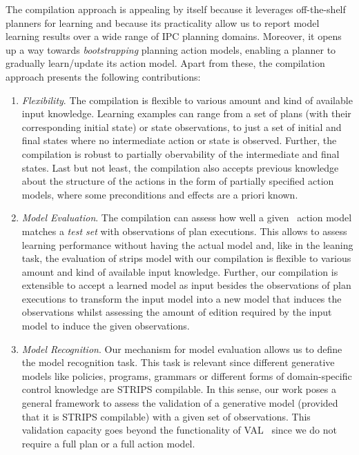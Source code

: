 The compilation approach is appealing by itself because it leverages off-the-shelf planners for learning and because its practicality allow us to report model learning results over a wide range of IPC planning domains. Moreover, it opens up a way towards \emph{bootstrapping} planning action models, enabling a planner to gradually learn/update its action model. Apart from these, the compilation approach presents the following contributions:
\begin{enumerate}
\item {\em Flexibility}. The compilation is flexible to various amount and kind of available input knowledge. Learning examples can range from a set of plans (with their corresponding initial state) or state observations, to just a set of initial and final states where no intermediate action or state is observed. Further, the compilation is robust to partially obervability of the intermediate and final states. Last but not least, the compilation also accepts previous knowledge about the structure of the actions in the form of partially specified action models, where some preconditions and effects are a priori known. %

\item {\em Model Evaluation}. The compilation can assess how well a given \strips\ action model matches a {\em test set} with observations of plan executions. This allows to assess learning performance without having the actual model and, like in the leaning task, the evaluation of strips model with our compilation is flexible to various amount and kind of available input knowledge. Further, our compilation is extensible to accept a learned model as input besides the observations of plan executions to transform the input model into a new model that induces the observations whilst assessing the amount of edition required by the input model to induce the given observations.

\item {\em Model Recognition}. Our mechanism for model evaluation allows us to define the model recognition task. This task is relevant since different generative models like policies, programs, grammars or different forms of domain-specific control knowledge are STRIPS compilable. In this sense, our work poses a general framework to assess the validation of a generative model (provided that it is STRIPS compilable) with a given set of observations. This validation capacity goes beyond the functionality of VAL~\cite{howey2004val} since we do not require a full plan or a full action model.
\end{enumerate}

